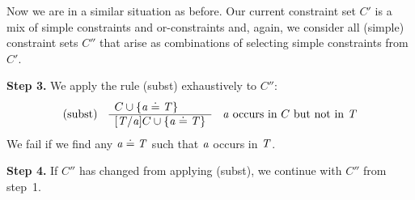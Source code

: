 Now we are in a similar situation as before. Our current constraint set $C'$ is a mix of simple constraints and or-constraints and, again, we
consider all (simple) constraint sets $C''$ that arise as combinations of selecting simple constraints from $C'$.

\textbf{Step 3.} We apply the rule (subst) exhaustively to $C''$:
\begin{gather*}
  \begin{array}[c]{lll}
    \text{(subst)} &
                     \begin{array}[c]{l}
                       C \cup \{ \mathit{ a } \doteq \mathit{T} \}\\
                       \hline
                       [\mathit{T}/\mathit{ a }]C \cup \{ \mathit{ a } \doteq \mathit{T} \}
                     \end{array}
                   & \mathit{ a } \text{ occurs in } C \text{ but not in } \mathit{T}
  \end{array}
\end{gather*}
We fail if we find any $\mathit{ a } \doteq \mathit{T}$ such that $\mathit{ a }$ occurs in $\mathit{T}$.

\textbf{Step 4.} If $C''$ has changed from applying (subst), we continue with $C''$ from step~1.

